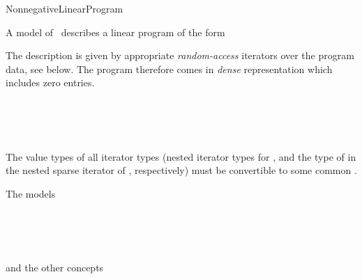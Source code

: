 \begin{ccRefConcept}{NonnegativeLinearProgram}

\ccDefinition
A model of \ccRefName\ describes a linear program of the form


The description is given by appropriate \emph{random-access} 
iterators over the program data, see below. The program therefore 
comes in \emph{dense} representation which includes zero entries.

\ccHasModels
{}\\
\\
\\


\ccTypes





\ccOperations






\ccRequirements

The value types of all iterator types (nested iterator types
for ,
and the type of  in the nested sparse iterator of
, respectively) must be
convertible to some common  .


\ccSeeAlso
The models

\\
\\
\\

and the other concepts

\\
\\
\end{ccRefConcept}
